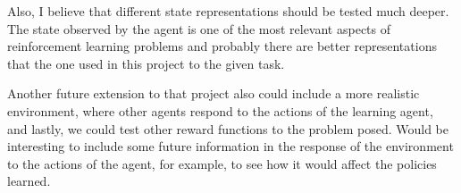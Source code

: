 \documentclass[a4paper]{article}
\begin{document}
Also, I believe that different state representations should be tested much deeper. The state observed by the agent is one of the most relevant aspects of reinforcement learning problems and probably there are better representations that the one used in this project to the given task.

Another future extension to that project also could include a more realistic environment, where other agents respond to the actions of the learning agent, and lastly, we could test other reward functions to the problem posed. Would be interesting to include some future information in the response of the environment to the actions of the agent, for example, to see how it would affect the policies learned.




\end{document}
